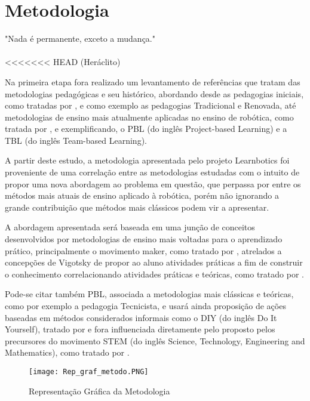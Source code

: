 \chapter{Metodologia}
\label{chap:meto}
\begin{flushright}
	"Nada é permanente, exceto a mudança." \\
	\ \\
<<<<<<< HEAD
	(Heráclito)
\end{flushright}

Na primeira etapa fora realizado um levantamento de referências que tratam das metodologias pedagógicas e seu histórico, abordando desde as pedagogias iniciais, como tratadas por \cite{larchert}, e como exemplo as pedagogias Tradicional e Renovada, até metodologias de ensino mais atualmente aplicadas no ensino de robótica, como tratada por \cite{Dillen}, e exemplificando, o PBL (do inglês Project-based Learning) e a TBL (do inglês Team-based Learning).

A partir deste estudo, a metodologia apresentada pelo projeto Learnbotics foi proveniente de uma correlação entre as metodologias estudadas com o intuito de propor uma nova abordagem ao problema em questão, que perpassa por entre os métodos mais atuais de ensino aplicado à robótica, porém não ignorando a grande
contribuição que métodos mais clássicos podem vir a apresentar.

A abordagem apresentada será baseada em uma junção de conceitos desenvolvidos por metodologias de ensino mais voltadas para o aprendizado prático, principalmente o movimento maker, como tratado por \cite{Dillen}, atrelados a concepções de Vigotsky de propor ao aluno atividades práticas a fim de construir o conhecimento correlacionando atividades práticas e teóricas, como tratado por \cite{Palangana}.

Pode-se citar também PBL, associada a metodologias mais clássicas e teóricas, como por exemplo a pedagogia Tecnicista, e usará ainda proposição de ações baseadas em métodos considerados informais como o DIY (do inglês Do It Yourself), tratado por \cite{wolf} e fora influenciada diretamente pelo proposto pelos precursores do movimento STEM (do inglês Science, Technology, Engineering and Mathematics), como tratado por \cite{pugli}.

\begin{figure}[h!]												
	\centering		
	\texttt{[image: Rep\_graf\_metodo.PNG]}			
	\caption{Representação Gráfica da Metodologia}		
	\label{img:rep_metod}	
\end{figure}

